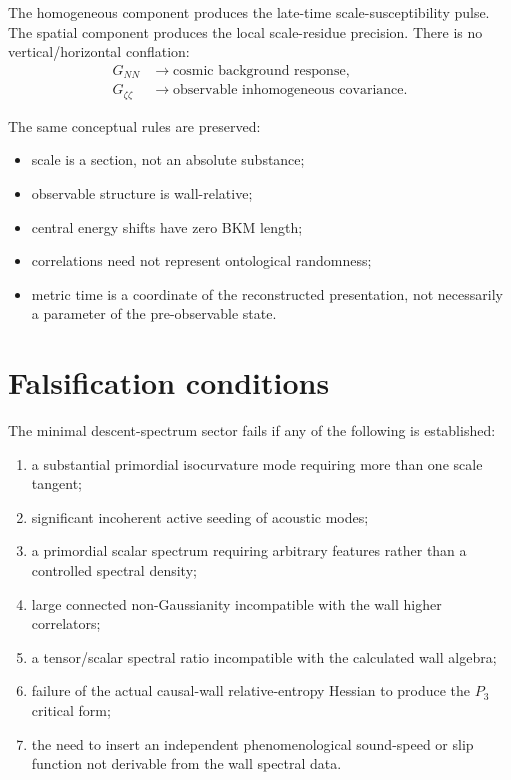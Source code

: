 \documentclass[11pt]{article}
\numberwithin{equation}{section}
\begin{document}
The homogeneous component produces the late-time scale-susceptibility pulse. The spatial component produces the local scale-residue precision. There is no vertical/horizontal conflation:
\begin{equation}
\boxed{
\begin{aligned}
G_{NN}&\longrightarrow\text{cosmic background response},\\
G_{\zeta\zeta}&\longrightarrow\text{observable inhomogeneous covariance}.
\end{aligned}}
\end{equation}

The same conceptual rules are preserved:
\begin{itemize}
\item scale is a section, not an absolute substance;
\item observable structure is wall-relative;
\item central energy shifts have zero BKM length;
\item correlations need not represent ontological randomness;
\item metric time is a coordinate of the reconstructed presentation, not necessarily a parameter of the pre-observable state.
\end{itemize}

\section{Falsification conditions}

The minimal descent-spectrum sector fails if any of the following is established:
\begin{enumerate}
\item a substantial primordial isocurvature mode requiring more than one scale tangent;
\item significant incoherent active seeding of acoustic modes;
\item a primordial scalar spectrum requiring arbitrary features rather than a controlled spectral density;
\item large connected non-Gaussianity incompatible with the wall higher correlators;
\item a tensor/scalar spectral ratio incompatible with the calculated wall algebra;
\item failure of the actual causal-wall relative-entropy Hessian to produce the $P_3$ critical form;
\item the need to insert an independent phenomenological sound-speed or slip function not derivable from the wall spectral data.
\end{enumerate}
\end{document}
